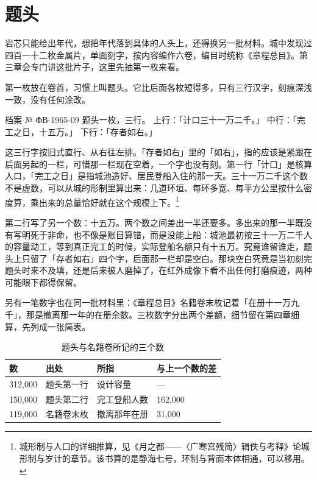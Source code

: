 \section{题头}

岩芯只能给出年代，想把年代落到具体的人头上，还得换另一批材料。城中发现过四百一十二枚金属片，单面刻字，按内容编作六卷，编目时统称《章程总目》。第三章会专门讲这批片子，这里先抽第一枚来看。

第一枚放在卷首，习惯上叫题头。它比后面各枚短得多，只有三行汉字，刻痕深浅一致，没有任何涂改。

\begin{archive}[内部参考]{档案 № ФВ-1965-09}
题头一枚，三行。
上行：「计口三十一万二千。」
中行：「完工之日，十五万。」
下行：「存者如右。」
\end{archive}

这三行字按旧式直行、从右往左排。「存者如右」里的「如右」，指的应该是紧跟在后面另起的一栏，可惜那一栏现在空着，一个字也没有刻。第一行「计口」是核算人口，「完工之日」是指城池造好、居民登船入住的那一天。三十一万二千这个数不是虚数，可以从城的形制里算出来：几道环垣、每环多宽、每平方公里按什么密度算，乘出来的总量恰好就在这个规模上下。\footnote{城形制与人口的详细推算，见《月之都——〈广寒宫残简〉辑佚与考释》论城形制与岁计的章节。该书算的是静海七号，环制与背面本体相通，可以移用。}

第二行写了另一个数：十五万。两个数之间差出一半还要多。多出来的那一半既没有写明死于非命，也不像是账目算错，而是没能上船：城池最初按三十一万二千人的容量动工，等到真正完工的时候，实际登船名额只有十五万。究竟谁留谁走，题头上只留了「存者如右」四个字，后面那一栏却是空白。那块空白究竟是当初刻完题头时来不及填，还是后来被人磨掉了，在红外成像下看不出任何打磨痕迹，两种可能眼下都得保留。

另有一笔数字也在同一批材料里：《章程总目》名籍卷末枚记着「在册十一万九千」，那是撤离那一年的在册余数。三枚数字分出两个差额，细节留在第四章细算，先列成一张简表。

\begin{table}[htbp]
  \centering
  \caption{题头与名籍卷所记的三个数}
  \begin{tabular}{@{}llll@{}}
    \toprule
    数 & 出处 & 所指 & 与上一个数的差\\
    \midrule
    312{,}000 & 题头第一行 & 设计容量 & — \\
    150{,}000 & 题头第二行 & 完工登船人数 & 162{,}000 \\
    119{,}000 & 名籍卷末枚 & 撤离那年在册 & 31{,}000 \\
    \bottomrule
  \end{tabular}
\end{table}

